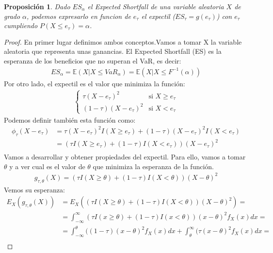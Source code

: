 \documentclass[11pt]{book}
\theoremstyle{plain} %
\newtheorem{proposition}{Proposición}
\theoremstyle{definition} %
\begin{document}
\begin{proposition}
   Dado $ES_\alpha$ el Expected Shortfall de una variable aleatoria $X$ de grado $\alpha$, 
   podemos expresarlo en funcion de $e_\tau$ el expectil ($ES_\tau = g(e_\tau)$) con 
   $e_\tau$ cumpliendo $P(X \leq e_\tau) = \alpha$. 
\end{proposition}
\begin{proof}
   En primer lugar definimos ambos conceptos.Vamos a tomar X la variable
   aleatoria que representa unas ganancias. El Expected Shortfall (ES)
   es la esperanza de los beneficios que no superan el VaR, es decir:
   \begin{align*}
       ES_\alpha = \mathbb{E}(X|X\leq VaR_\alpha) = \mathbb{E}(X|X\leq F^{-1}(\alpha))
   \end{align*}
   Por otro lado, el expectil es el valor que minimiza la función:
   \begin{align*}
       \begin{cases}
           \tau(X - e_\tau)^2 & \text{si } X \ge e_\tau \\
           (1 - \tau)(X - e_\tau)^2 & \text{si } X < e_\tau
       \end{cases}
   \end{align*}
   Podemos definir también esta función como:
   \begin{align*}
       \phi_{\tau}(X - e_\tau) &= \tau(X - e_\tau)^2 I(X \ge e_\tau) + (1 - \tau)(X - e_\tau)^2 I(X < e_\tau) \\
        &= (\tau I(X \ge e_\tau) + (1 - \tau)I(X < e_\tau))(X - e_\tau)^2 \\
   \end{align*}
   Vamos a desarrollar y obtener propiedades del expectil. Para ello, 
   vamos a tomar $\theta$ y a ver cual es  el valor de $\theta$ que minimiza 
   la esperanza de la función.
   \begin{align*}
      g_{\tau, \theta}(X) = (\tau I(X \ge \theta) + (1 - \tau)I(X < \theta))(X - \theta)^2 
   \end{align*}
   Vemos su esperanza:
   \begin{align*}
      E_{X}(g_{\tau, \theta}(X)) &= E_{X}((\tau I(X \ge \theta) + (1 - \tau)I(X < \theta))(X - \theta)^2) = \\
      &= \int_{-\infty}^{\infty}(\tau I(x \ge \theta) + (1 - \tau)I(x < \theta))(x - \theta)^2 f_X(x)dx = \\
      &= \int_{-\infty}^{\theta}((1 - \tau)(x - \theta)^2 f_X(x)dx + \int_{\theta}^{\infty}(\tau (x - \theta)^2 f_X(x)dx = \\

\end{align*}
\end{proof}
\end{document}
